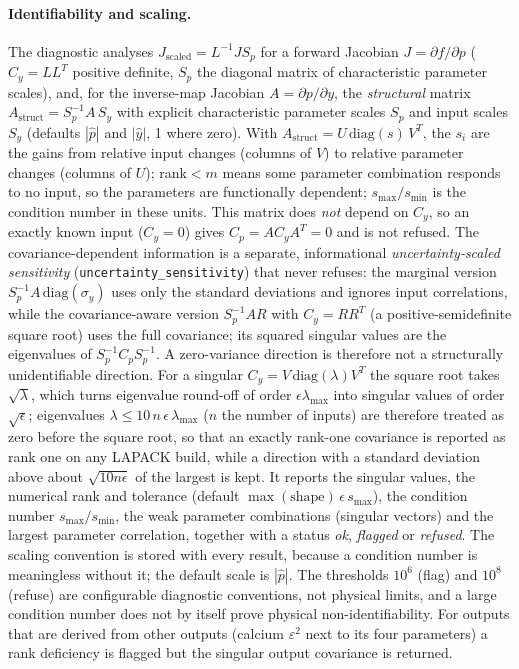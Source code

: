 \paragraph{Identifiability and scaling.} The diagnostic analyses $J_{\mathrm{scaled}}=L^{-1}J S_p$ for a forward Jacobian $J=\partial f/\partial p$ ($C_y=LL^{T}$ positive definite, $S_p$ the diagonal matrix of characteristic parameter scales), and, for the inverse-map Jacobian $A=\partial p/\partial y$, the \emph{structural} matrix $A_{\mathrm{struct}}=S_p^{-1}A\,S_y$ with explicit characteristic parameter scales $S_p$ and input scales $S_y$ (defaults $|\hat p|$ and $|\hat y|$, 1 where zero). With $A_{\mathrm{struct}}=U\,\mathrm{diag}(s)\,V^{T}$, the $s_i$ are the gains from relative input changes (columns of $V$) to relative parameter changes (columns of $U$); rank${}<m$ means some parameter combination responds to no input, so the parameters are functionally dependent; $s_{\max}/s_{\min}$ is the condition number in these units. This matrix does \emph{not} depend on $C_y$, so an exactly known input ($C_y=0$) gives $C_p=A C_y A^{T}=0$ and is not refused. The covariance-dependent information is a separate, informational \emph{uncertainty-scaled sensitivity} (\texttt{uncertainty\_sensitivity}) that never refuses: the marginal version $S_p^{-1}A\,\mathrm{diag}(\sigma_y)$ uses only the standard deviations and ignores input correlations, while the covariance-aware version $S_p^{-1}A R$ with $C_y=RR^{T}$ (a positive-semidefinite square root) uses the full covariance; its squared singular values are the eigenvalues of $S_p^{-1}C_pS_p^{-1}$. A zero-variance direction is therefore not a structurally unidentifiable direction. For a singular $C_y=V\,\mathrm{diag}(\lambda)V^{T}$ the square root takes $\sqrt{\lambda}$, which turns eigenvalue round-off of order $\epsilon\lambda_{\max}$ into singular values of order $\sqrt{\epsilon}$; eigenvalues $\lambda\le 10\,n\,\epsilon\,\lambda_{\max}$ ($n$ the number of inputs) are therefore treated as zero before the square root, so that an exactly rank-one covariance is reported as rank one on any LAPACK build, while a direction with a standard deviation above about $\sqrt{10 n\epsilon}$ of the largest is kept. It reports the singular values, the numerical rank and tolerance (default $\max(\text{shape})\,\epsilon\,s_{\max}$), the condition number $s_{\max}/s_{\min}$, the weak parameter combinations (singular vectors) and the largest parameter correlation, together with a status \emph{ok}, \emph{flagged} or \emph{refused}. The scaling convention is stored with every result, because a condition number is meaningless without it; the default scale is $|\hat p|$. The thresholds $10^{6}$ (flag) and $10^{8}$ (refuse) are configurable diagnostic conventions, not physical limits, and a large condition number does not by itself prove physical non-identifiability. For outputs that are derived from other outputs (calcium $\varepsilon^2$ next to its four parameters) a rank deficiency is flagged but the singular output covariance is returned.

